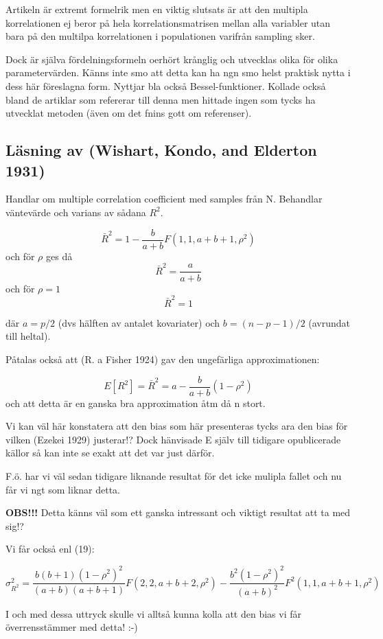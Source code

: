 \documentclass[]{article}
\begin{document}
Artikeln är extremt formelrik men en viktig slutsats är att den multipla
korrelationen ej beror på hela korrelationsmatrisen mellan alla
variabler utan bara på den multilpa korrelationen i populationen
varifrån sampling sker.

Dock är själva fördelningsformeln oerhört krånglig och utvecklas olika
för olika parametervärden. Känns inte smo att detta kan ha ngn smo helst
praktisk nytta i dess här föreslagna form. Nyttjar bla också
Bessel-funktioner. Kollade också bland de artiklar som refererar till
denna men hittade ingen som tycks ha utvecklat metoden (även om det
fnins gott om referenser).

\subsection{Läsning av (Wishart, Kondo, and Elderton
1931)}\label{lasning-av-wishart1931}

Handlar om multiple correlation coefficient med samples från N.
Behandlar väntevärde och varians av sådana \(R^2\).

\[\bar{R}^2 = 1 - \frac{b}{a + b}F(1, 1, a+b+1, \rho^2)\] och för
\(\rho\) ges då \[\bar{R}^2 = \frac{a}{a + b}\] och för \(\rho = 1\)
\[\bar{R}^2 = 1\]

där \(a = p/2\) (dvs hälften av antalet kovariater) och
\(b = (n - p - 1)/2\) (avrundat till heltal).

Påtalas också att (R. a Fisher 1924) gav den ungefärliga
approximationen:

\[E[R^2] = \bar{R}^2 = a - \frac{b}{a + b}(1-\rho^2)\] och att detta är
en ganska bra approximation åtm då n stort.

Vi kan väl här konstatera att den bias som här presenteras tycks ara den
bias för vilken (Ezekei 1929) justerar!? Dock hänvisade E själv till
tidigare opublicerade källor så kan inte se exakt att det var just
därför.

F.ö. har vi väl sedan tidigare liknande resultat för det icke mulipla
fallet och nu får vi ngt som liknar detta.

\textbf{OBS!!!} Detta känns väl som ett ganska intressant och viktigt
resultat att ta med sig!?

Vi får också enl (19):

\[\sigma^2_{R^2} = \frac{b(b+1)(1-\rho^2)^2}{(a+b)(a + b +1)}F(2,2,a+b+2,\rho^2) - \frac{b^2(1-\rho^2)^2}{(a+b)^2}F^2(1,1,a+b+1, \rho^2)\]

I och med dessa uttryck skulle vi alltså kunna kolla att den bias vi får
överrensstämmer med detta! :-)
\end{document}
